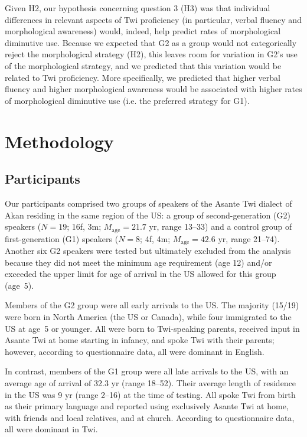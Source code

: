 \documentclass[output=paper,colorlinks,citecolor=brown]{langscibook}
\begin{document}
Given H2, our hypothesis concerning question 3 (H3) was that individual differences in relevant aspects of Twi proficiency (in particular, verbal fluency and morphological awareness) would, indeed, help predict rates of morphological diminutive use. Because we expected that G2 as a group would not categorically reject the morphological strategy (H2), this leaves room for variation in G2's use of the morphological strategy, and we predicted that this variation would be related to Twi proficiency. More specifically, we predicted that higher verbal fluency and higher morphological awareness would be associated with higher rates of morphological diminutive use (i.e. the preferred strategy for G1).


\section{Methodology}
\label{MethodsSec}

\subsection{Participants}
\label{ParticipantsSec}

Our participants comprised two groups of speakers of the Asante Twi dialect of Akan residing in the same region of the US: a group of second-generation (G2) speakers ($N=19$; 16f, 3m; $M_{\text{age}}=21.7$ yr, range 13--33) and a control group of first-generation (G1) speakers ($N=8$; 4f, 4m; $M_{\text{age}}=42.6$ yr, range 21--74). Another six G2 speakers were tested but ultimately excluded from the analysis because they did not meet the minimum age requirement (age 12) and/or exceeded the upper limit for age of arrival in the US allowed for this group (age~5). 

Members of the G2 group were all early arrivals to the US. The majority (15/19) were born in North America (the US or Canada), while four immigrated to the US at age~5 or younger. All were born to Twi-speaking parents, received input in Asante Twi at home starting in infancy, and spoke Twi with their parents; however, according to questionnaire data, all were dominant in English.

In contrast, members of the G1 group were all late arrivals to the US, with an average age of arrival of 32.3 yr (range 18--52). Their average length of residence in the US was 9 yr (range 2--16) at the time of testing. All spoke Twi from birth as their primary language and reported using exclusively Asante Twi at home, with friends and local relatives, and at church. According to questionnaire data, all were dominant in Twi.
\end{document}
